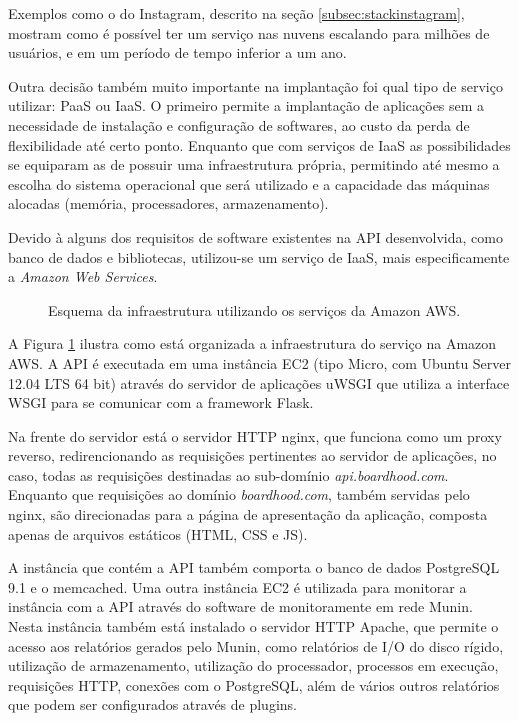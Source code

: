 \documentclass[diss]{template/setrem}
\begin{document}
Exemplos como o do Instagram, descrito na seção \ref{subsec:stackinstagram}, mostram como é possível ter um serviço nas nuvens escalando para milhões de usuários, e em um período de tempo inferior a um ano.

Outra decisão também muito importante na implantação foi qual tipo de serviço utilizar: PaaS ou IaaS. O primeiro permite a implantação de aplicações sem a necessidade de instalação e configuração de softwares, ao custo da perda de flexibilidade até certo ponto. Enquanto que com serviços de IaaS as possibilidades se equiparam as de possuir uma infraestrutura própria, permitindo até mesmo a escolha do sistema operacional que será utilizado e a capacidade das máquinas alocadas (memória, processadores, armazenamento).

Devido à alguns dos requisitos de software existentes na API desenvolvida, como banco de dados e bibliotecas,  utilizou-se um serviço de IaaS, mais especificamente a \emph{Amazon Web Services}.

\begin{figure}[!h]
    \caption{Esquema da infraestrutura utilizando os serviços da Amazon AWS.}
    \label{fig:infra}
\end{figure}

A Figura \ref{fig:infra} ilustra como está organizada a infraestrutura do serviço na Amazon AWS. A API é executada em uma instância EC2 (tipo Micro, com Ubuntu Server 12.04 LTS 64 bit) através do servidor de aplicações uWSGI que utiliza a interface WSGI para se comunicar com a framework Flask.

Na frente do servidor está o servidor HTTP nginx, que funciona como um proxy reverso, redirencionando as requisições pertinentes ao servidor de aplicações, no caso, todas as requisições destinadas ao sub-domínio \emph{api.boardhood.com}. Enquanto que requisições ao domínio \emph{boardhood.com}, também servidas pelo nginx, são direcionadas para a página de apresentação da aplicação, composta apenas de arquivos estáticos (HTML, CSS e JS).

A instância que contém a API também comporta o banco de dados PostgreSQL 9.1 e o memcached. Uma outra instância EC2 é utilizada para monitorar a instância com a API através do software de monitoramente em rede Munin. Nesta instância também está instalado o servidor HTTP Apache, que permite o acesso aos relatórios gerados pelo Munin, como relatórios de I/O do disco rígido, utilização de armazenamento, utilização do processador, processos em execução, requisições HTTP, conexões com o PostgreSQL, além de vários outros relatórios que podem ser configurados através de plugins.
\end{document}
